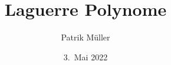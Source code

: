 %
%
%


\beamertemplatenavigationsymbolsempty
\title[Laguerre]{Laguerre Polynome}
\author[P.~Müller]{Patrik Müller}
\date[]{3.~Mai 2022}

